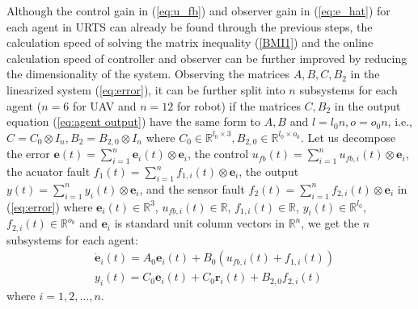 \documentclass[journal,12pt,onecolumn,draftclsnofoot,]{IEEEtran}
\begin{document}

Although the control gain in (\ref{eq:u_fb}) and observer gain in (\ref{eq:e_hat}) for each agent in URTS can already be found through the previous steps, the calculation speed of solving the matrix inequality (\ref{BMI1}) and the online calculation speed of controller and observer can be further improved by reducing the dimensionality of the system. Observing the matrices $A,B,C,B_2$ in the linearized system (\ref{eq:error}), it can be further split into $n$ subsystems for each agent ($n=6$ for UAV and $n=12$ for robot) if the matrices $C,B_2$ in the output equation (\ref{eq:agent output}) have the same form to $A,B$ and $l=l_0n, o=o_0n$, i.e., $C = C_0\otimes I_n,B_2 = B_{2,0}\otimes I_n$ where $C_0\in\mathbb{R}^{l_0\times 3},B_{2,0}\in\mathbb{R}^{l_0\times o_0}$. Let us decompose 
the error $\pmb{e}(t)=\sum_{i=1}^{n} \pmb{e}_i(t)\otimes\mathbf{e}_i$, 
the control $u_{fb}(t)=\sum_{i=1}^{n} {u}_{fb,i}(t)\otimes\mathbf{e}_i$, 
the acuator fault $f_{1}(t)=\sum_{i=1}^{n} {f}_{1,i}(t)\otimes\mathbf{e}_i$, 
the output $y(t)=\sum_{i=1}^{n} {y}_i(t)\otimes\mathbf{e}_i$, 
and the sensor fault $f_{2}(t)=\sum_{i=1}^{n} {f}_{2,i}(t)\otimes\mathbf{e}_i$ in (\ref{eq:error})
where $\pmb{e}_i(t)\in\mathbb{R}^3$, $u_{fb,i}(t)\in\mathbb{R}$, $f_{1,i}(t)\in\mathbb{R}$, $y_i(t)\in\mathbb{R}^{l_0}$, $f_{2,i}(t)\in\mathbb{R}^{o_0}$ and $\mathbf{e}_i$ is standard unit column vectors in $\mathbb{R}^n$, we get the $n$ subsystems for each agent:
\begin{equation} \label{eq:linear subsys}
    \begin{split}
        & \dot{\pmb{e}}_i(t)=A_0\pmb{e}_i(t)+B_0(u_{fb,i}(t)+f_{1,i}(t)) \\
        & {y}_i(t)=C_0\pmb{e}_i(t) + C_0\pmb{r}_i(t) + B_{2,0}f_{2,i}(t)   
    \end{split}
\end{equation} where $i=1,2,...,n$.
\end{document}
